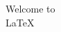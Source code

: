 \documentclass{article}
\begin{document}
    \begin{center}
        Welcome to \\
        \LaTeX
    \end{center}
\end{document}
